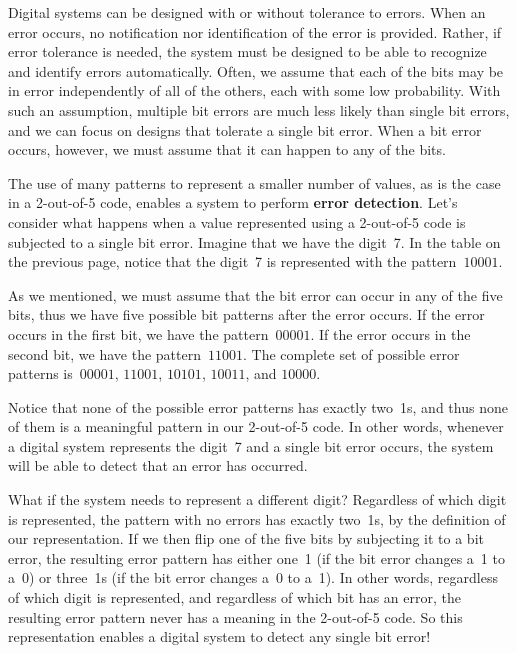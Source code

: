 \pagebreak

Digital systems can be designed with or without tolerance to errors.
When an error occurs, no notification nor identification of the error
is provided.  Rather, if error tolerance is needed,
the system must be designed to be able to 
recognize and identify errors automatically.
%
Often, we assume that each of the bits may be in error independently
of all of the others, each with some low probability.  With such
an assumption, multiple bit errors
are much less likely than single bit errors, and we can focus on 
designs that tolerate a single bit error.
%
When a bit error occurs, however, we must assume that 
it can happen to any of the bits.

The use of many patterns to represent a smaller number of values, as
is the case in a \mbox{2-out-of-5} code, enables a system
to perform {\bf error detection}.
%
Let's consider what happens when a value represented using a 
\mbox{2-out-of-5} code is subjected to a single bit error.
Imagine that we have the digit~7.  In the table on the previous page,
notice that the digit~7 is represented with the pattern~$10001$.

As we mentioned, we must assume that the bit error can occur in any 
of the five bits, thus we have five possible bit patterns after the error 
occurs.  If the error occurs in the first bit, we have the pattern~$00001$.
If the error occurs in the second bit, we have the pattern~$11001$.
The complete set of possible error patterns is~$00001$, $11001$, $10101$,
$10011$, and $10000$.  

Notice that none of the possible error patterns has exactly two~1s, and 
thus none of them is a meaningful pattern in our \mbox{2-out-of-5} code.
In other words, whenever a digital system represents the digit~7 and 
a single bit error occurs, the system will be able to detect that an 
error has occurred.

What if the system needs to represent a different digit?  
Regardless of which digit is represented, the pattern with no errors 
has exactly two~1s,
by the definition of our representation.  If we then flip one of the 
five bits by subjecting it to a bit error, the resulting error pattern
has either one~1 (if the bit error changes a~1 to a~0) or three~1s
(if the bit error changes a~0 to a~1).  In other words, regardless of
which digit is represented, and regardless of which bit has an error,
the resulting error pattern never has a meaning in 
the \mbox{2-out-of-5} code.  So this representation enables a digital
system to detect any single bit error!\\



